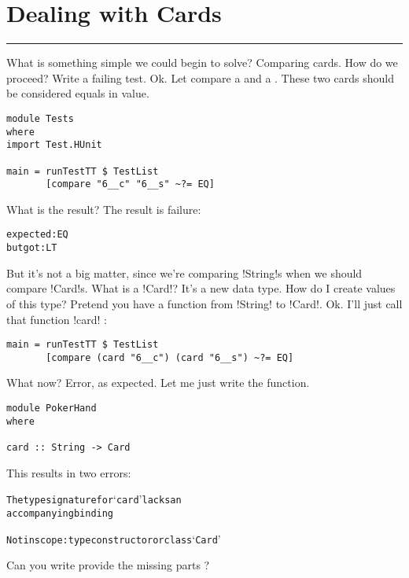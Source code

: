 \newpage
\section{Dealing with Cards} %
\vspace{10cm}
\hrule

\lhQ What is something simple we could begin to solve?
\lhA Comparing cards.
\lhN How do we proceed?
\lhA Write a failing test.
\lhN Ok. Let compare a  and a . These two cards should be considered equals in value.
\begin{lstlisting}[frame=single]
module Tests
where 
import Test.HUnit

main = runTestTT $ TestList 
       [compare "6__c" "6__s" ~?= EQ]
\end{lstlisting} %
What is the result?
\lhA \failure The result is failure: 
\begin{small} 
\begin{alltt}
expected: EQ
 but got: LT
\end{alltt}
\end{small}
But it's not a big matter, since we're comparing \il!String!s when we should compare \il!Card!s.
\lhN What is a \il!Card!?
\lhA It's a new data type.
\lhN How do I create values of this type?
\lhA Pretend you have a function from \il!String! to \il!Card!.
\lhN Ok. I'll just call that function \il!card! :
\begin{lstlisting}[frame=single]
main = runTestTT $ TestList 
       [compare (card "6__c") (card "6__s") ~?= EQ] 
\end{lstlisting} %
What now?
\lhA \error Error, as expected. Let me just write the function.
\begin{lstlisting}[frame=single]
module PokerHand
where

card :: String -> Card
\end{lstlisting}
\lhN \error This results in two errors: 
\begin{small}
\begin{alltt}
The type signature for `card' lacks an 
accompanying binding

Not in scope: type constructor or class `Card'
\end{alltt}
\end{small}
Can you write provide the missing parts ?

